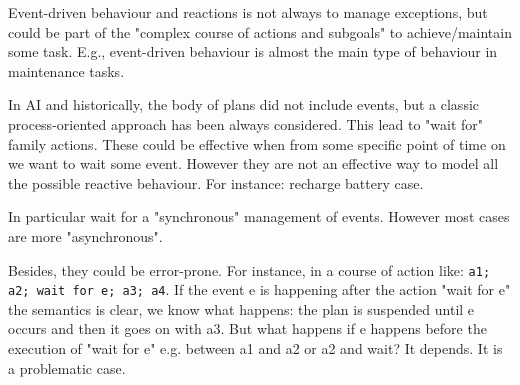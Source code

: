 Event-driven behaviour and reactions is not always to manage exceptions, but could be part of the "complex course of actions and subgoals" to achieve/maintain some task.  
%
E.g., event-driven behaviour is almost the main type of behaviour in maintenance tasks.

In AI and historically, the body of plans did not include events, but a classic process-oriented approach has been always considered.
%
This lead to "wait for" family actions. These could be effective when from some specific point of time on we want to wait some event. 
%
However they are not an effective way to model all the possible reactive behaviour.
%
For instance: recharge battery case.

In particular wait for a "synchronous" management of events. However most cases are more "asynchronous".

Besides, they could be error-prone. 
%
For instance, in a course of action like: \texttt{a1; a2; wait for e; a3; a4}.
%
If the event e is happening after the action "wait for e" the semantics is clear, we know what happens: the plan is suspended until e occurs and then it goes on with a3. But what happens if e happens before the execution of "wait for e" e.g. between a1 and a2 or a2 and wait? It depends. It is a problematic case.





